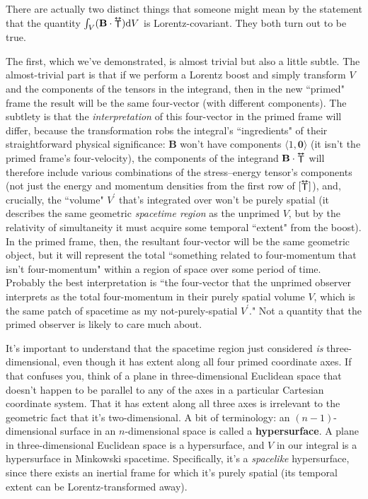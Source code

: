 \documentclass[12pt]{article}
\renewcommand{\vv}[1]{\mathbf{#1}}
\newcommand{\dd}[1]{\mathrm{d}#1}
\newcommand{\tightoverset}[2]{%
  \mathop{#2}\limits^{\vbox to -.5ex{\kern-0.75ex\hbox{$#1$}\vss}}}
\newcommand{\inlinedy}[1]{\tightoverset{\text{\tiny$\bm\leftrightarrow$}}{#1}}
\begin{document}
There are actually two distinct things that someone might mean by the statement that the quantity ${\int_V (\vv B \cdot {\inlinedy{\mathsf{T}}}) \dd V}$ is Lorentz-covariant. They both turn out to be true.

The first, which we've demonstrated, is almost trivial but also a little subtle. The almost-trivial part is that if we perform a Lorentz boost and simply transform $V$ and the components of the tensors in the integrand, then in the new ``primed" frame the result will be the same four-vector (with different components). The subtlety is that the \emph{interpretation} of this four-vector in the primed frame will differ, because the transformation robs the integral's ``ingredients" of their straightforward physical significance: $\vv B$ won't have components $\langle 1, \vv 0 \rangle$ (it isn't the primed frame's four-velocity), the components of the integrand $\vv B \cdot {\inlinedy{\mathsf{T}}}$ will therefore include various combinations of the stress--energy tensor's components (not just the energy and momentum densities from the first row of $[{\inlinedy{\mathsf{T}}}]$), and, crucially, the ``volume" $V^{\prime}$ that's integrated over won't be purely spatial (it describes the same geometric \emph{spacetime region} as the unprimed $V$, but by the relativity of simultaneity it must acquire some temporal ``extent" from the boost). In the primed frame, then, the resultant four-vector will be the same geometric object, but it will represent the total ``something related to four-momentum that isn't four-momentum" within a region of space over some period of time. Probably the best interpretation is ``the four-vector that the unprimed observer interprets as the total four-momentum in their purely spatial volume $V$, which is the same patch of spacetime as my not-purely-spatial $V^{\prime}$." Not a quantity that the primed observer is likely to care much about.

It's important to understand that the spacetime region just considered \emph{is} three-dimensional, even though it has extent along all four primed coordinate axes. If that confuses you, think of a plane in three-dimensional Euclidean space that doesn't happen to be parallel to any of the axes in a particular Cartesian coordinate system. That it has extent along all three axes is irrelevant to the geometric fact that it's two-dimensional. A bit of terminology: an $(n - 1)$-dimensional surface in an $n$-dimensional space is called a \textbf{hypersurface}. A plane in three-dimensional Euclidean space is a hypersurface, and $V$ in our integral is a hypersurface in Minkowski spacetime. Specifically, it's a \emph{spacelike} hypersurface, since there exists an inertial frame for which it's purely spatial (its temporal extent can be Lorentz-transformed away).
\end{document}
